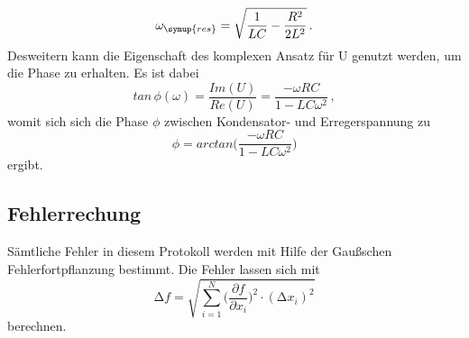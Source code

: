         \begin{equation}
            \label{eqn:resonanz}
            \omega_{\symup{res}}=\sqrt{\frac{1}{LC}-\frac{R^2}{2L^2}} \, .
        \end{equation}
        Desweitern kann die Eigenschaft des komplexen Ansatz für U genutzt werden, um die Phase zu erhalten. Es ist dabei
        \begin{equation*}
            tan\, \phi(\omega)= \frac{Im(U)}{Re(U)}=\frac{-\omega RC}{1-LC\omega^2}\, ,
        \end{equation*}
        womit sich sich die Phase $\phi$ zwischen Kondensator- und Erregerspannung zu
        \begin{equation}
            \label{eqn:phase}
            \phi = arctan\biggl(\frac{-\omega RC}{1-LC\omega^2}\biggr)
        \end{equation}
        ergibt.
    \subsection{Fehlerrechung}
        Sämtliche Fehler in diesem Protokoll werden mit Hilfe der Gaußschen Fehlerfortpflanzung bestimmt. Die Fehler lassen sich mit
        \begin{equation}
            \label{eqn:Fehlerfortpflanzung}
            \increment f = \sqrt{\sum_{i=1}^N{\biggl(\frac{\partial f}{\partial x_i}\biggr)^2}\cdot (\increment x_i)^2}
        \end{equation}
        berechnen.

